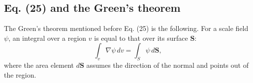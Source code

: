 \documentclass[11pt]{article}
\newcommand{\vct}[1]{\boldsymbol{\mathbf{#1}}}
\newcommand{\vE}{\vct{E}}
\newcommand{\vMbar}{\overline{\vct{M}}}
\newcommand{\vmu}{\vct{\upmu}}
\begin{document}
%
%
%



\begin{center}
\end{center}



\subsection{Eq. (25) and the Green's theorem}



The Green's theorem mentioned before Eq. (25) is the following.
%
For a scale field $\psi$,
an integral over a region $v$
is equal to that over its surface $\vct S$:
\begin{equation}
  \int_v \nabla \psi \, d v
=
  \int_S \psi \, d\vct S,
  \label{eq:green}
\end{equation}
%
where the area element $d\vct S$
assumes the direction of the normal
and points out of the region.
\end{document}
